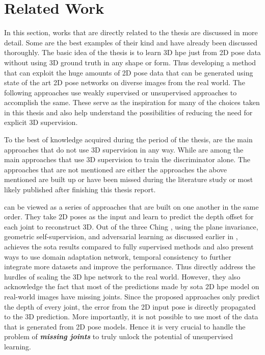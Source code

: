 \section{Related Work}
\label{sec:Related Work}

In this section, works that are directly related to the thesis are discussed in more detail. Some are the best examples of their kind and have already been discussed thoroughly. The basic idea of the thesis is to learn 3D \ac{hpe} just from 2D pose data without using 3D ground truth in any shape or form. Thus developing a method that can exploit the huge amounts of 2D pose data that can be generated using state of the art 2D pose networks on diverse images from the real world. The following approaches use weakly supervised or unsupervised approaches to accomplish the same. These serve as the inspiration for many of the choices taken in this thesis and also help understand the possibilities of reducing the need for explicit 3D supervision.

To the best of knowledge acquired during the period of the thesis, \cite{can3dpose, amazon1, unsupervisedAdversarial, c3dpo} are the main approaches that do not use 3D supervision in any way. While \cite{repnet, weaklymultiple} are among the main approaches that use 3D supervision to train the discriminator alone. The approaches that are not mentioned are either the approaches the above mentioned are built up or have been missed during the literature study or most likely published after finishing this thesis report.

\cite{unsupervisedAdversarial, can3dpose, amazon1} can be viewed as a series of approaches that are built on one another in the same order. They take 2D poses as the input and learn to predict the depth offset for each joint to reconstruct 3D. Out of the three Ching \etal \cite{amazon1}, using the plane invariance, geometric self-supervision, and adversarial learning as discussed earlier in , achieves the \ac{sota} results compared to fully supervised methods and also present ways to use domain adaptation network, temporal consistency to further integrate more datasets and improve the performance. Thus directly address the hurdles of scaling the 3D \ac{hpe} network to the real world. However, they also acknowledge the fact that most of the predictions made by \ac{sota} 2D \ac{hpe} model on real-world images have missing joints. Since the proposed approaches only predict the depth of every joint, the error from the 2D input pose is directly propagated to the 3D prediction. More importantly, it is not possible to use most of the data that is generated from 2D pose models. Hence it is very crucial to handle the problem of \textit{\textbf{missing joints}} to truly unlock the potential of unsupervised learning.

